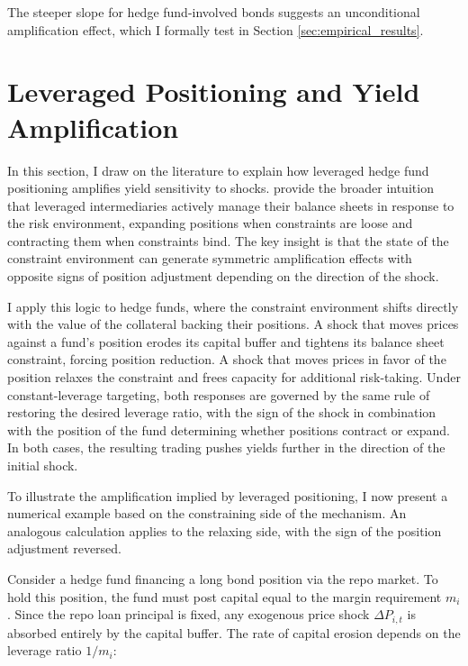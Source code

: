 \documentclass[english, 11pt, oneside]{article}
\begin{document}
The steeper slope for hedge fund-involved bonds suggests an unconditional amplification effect, which I formally test in Section \ref{sec:empirical_results}.



\section{Leveraged Positioning and Yield Amplification}
\label{sec:mechanism}

In this section, I draw on the literature to explain how leveraged hedge fund positioning amplifies yield sensitivity to shocks. \citet{adrian2014} provide the broader intuition that leveraged intermediaries actively manage their balance sheets in response to the risk environment, expanding positions when constraints are loose and contracting them when constraints bind. The key insight is that the state of the constraint environment can generate symmetric amplification effects with opposite signs of position adjustment depending on the direction of the shock.

I apply this logic to hedge funds, where the constraint environment shifts directly with the value of the collateral backing their positions. A shock that moves prices against a fund's position erodes its capital buffer and tightens its balance sheet constraint, forcing position reduction. A shock that moves prices in favor of the position relaxes the constraint and frees capacity for additional risk-taking. Under constant-leverage targeting, both responses are governed by the same rule of restoring the desired leverage ratio, with the sign of the shock in combination with the position of the fund determining whether positions contract or expand. In both cases, the resulting trading pushes yields further in the direction of the initial shock.

To illustrate the amplification implied by leveraged positioning, I now present a numerical example based on the constraining side of the mechanism. An analogous calculation applies to the relaxing side, with the sign of the position adjustment reversed.

Consider a hedge fund financing a long bond position via the repo market. To hold this position, the fund must post capital equal to the margin requirement $m_i$. Since the repo loan principal is fixed, any exogenous price shock $\Delta P_{i,t}$ is absorbed entirely by the capital buffer. The rate of capital erosion depends on the leverage ratio $1/m_i$:
\end{document}
